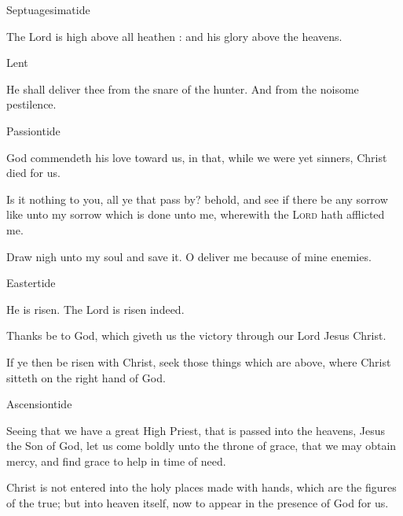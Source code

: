 \begin{multicols}{2}
\begin{inhead}
Septuagesimatide
\end{inhead}\noindent
The Lord is high above all heathen : and his glory above the heavens.


\begin{inhead}
Lent
\end{inhead}\noindent
    He shall deliver thee from the snare of the hunter. And from the noisome pestilence.

\begin{inhead}
Passiontide
\end{inhead}\noindent
    God commendeth his love toward us, in that, while we were yet sinners, Christ died for us.\par
    Is it nothing to you, all ye that pass by? behold, and see if there be any sorrow like unto my sorrow which is done unto me, wherewith the \textsc{Lord} hath afflicted me.\par
Draw nigh unto my soul and save it. O deliver me because of mine enemies.

\begin{inhead}
Eastertide
\end{inhead}\noindent
    He is risen. The Lord is risen indeed.\par
    Thanks be to God, which giveth us the victory through our Lord Jesus Christ.\par
    If ye then be risen with Christ, seek those things which are above, where Christ sitteth on the right hand of God.

\begin{inhead}
Ascensiontide
\end{inhead}\noindent
    Seeing that we have a great High Priest, that is passed into the heavens, Jesus the Son of God, let us come boldly unto the throne of grace, that we may obtain mercy, and find grace to help in time of need.\par
    
    Christ is not entered into the holy places made with hands, which are the figures of the true; but into heaven itself, now to appear in the presence of God for us.\par


\end{multicols}
